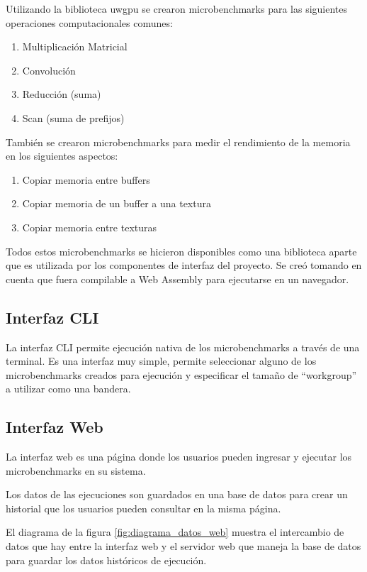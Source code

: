 \documentclass[conference]{IEEEtran}
\begin{document}
Utilizando la biblioteca uwgpu se crearon microbenchmarks para las siguientes
operaciones computacionales comunes:

\begin{enumerate}
  \item Multiplicación Matricial
  \item Convolución
  \item Reducción (suma)
  \item Scan (suma de prefijos)
\end{enumerate}

También se crearon microbenchmarks para medir el rendimiento de la memoria en
los siguientes aspectos:

\begin{enumerate}
  \item Copiar memoria entre buffers
  \item Copiar memoria de un buffer a una textura
  \item Copiar memoria entre texturas
\end{enumerate}

Todos estos microbenchmarks se hicieron disponibles como una biblioteca aparte
que es utilizada por los componentes de interfaz del proyecto. Se creó tomando
en cuenta que fuera compilable a Web Assembly para ejecutarse en un navegador.

\subsection{Interfaz CLI}

La interfaz CLI permite ejecución nativa de los microbenchmarks a través de una terminal.
Es una interfaz muy simple, permite seleccionar alguno de los microbenchmarks creados para ejecución y especificar el tamaño de “workgroup” a utilizar como una bandera.

\subsection{Interfaz Web}

La interfaz web es una página donde los usuarios pueden ingresar y ejecutar los microbenchmarks en su sistema.

Los datos de las ejecuciones son guardados en una base de datos para crear un historial que los usuarios pueden consultar en la misma página.

El diagrama de la figura \ref{fig:diagrama_datos_web} muestra el intercambio de datos que hay entre la interfaz web y el servidor web que maneja la base de datos
para guardar los datos históricos de ejecución.
\end{document}
